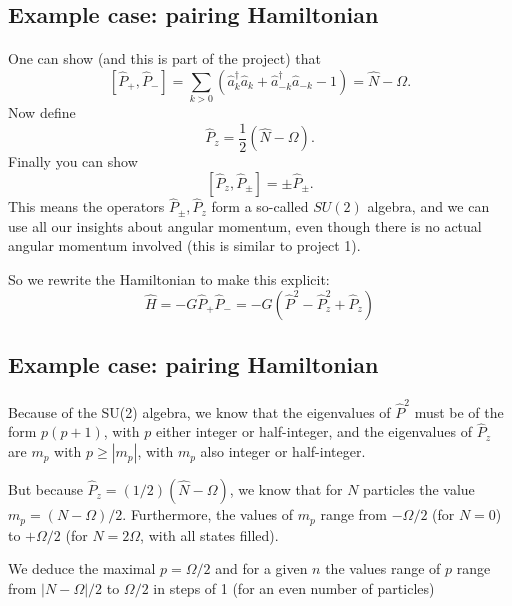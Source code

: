 \documentclass[%
twoside,                 %
final,                   %
10pt]{article}
\begin{document}
\subsection*{Example case: pairing Hamiltonian}

\paragraph{}

One can show (and this is part of the project) that
\[
\left [ \hat{P}_+, \hat{P}_- \right ] = \sum_{k> 0} \left( \hat{a}^\dagger_k \hat{a}_k 
+ \hat{a}^\dagger_{-{k}} \hat{a}_{-{k}} - 1 \right) = \hat{N} - \Omega.
\]
Now define 
\[
\hat{P}_z = \frac{1}{2} ( \hat{N} -\Omega).
\]
Finally you can show
\[
\left [ \hat{P}_z , \hat{P}_\pm \right ] = \pm \hat{P}_\pm.
\]
This means the operators $\hat{P}_\pm, \hat{P}_z$ form a so-called  $SU(2)$ algebra, and we can 
use all our insights about angular momentum, even though there is no actual 
angular momentum involved (this is similar to project 1).

So we rewrite the Hamiltonian to make this explicit:
\[
\hat{H} = -G \hat{P}_+ \hat{P}_- 
= -G \left( \hat{P}^2 - \hat{P}_z^2 + \hat{P}_z\right)
\]



\subsection*{Example case: pairing Hamiltonian}

\paragraph{}

Because of the SU(2) algebra, we know that the eigenvalues of 
$\hat{P}^2$ must be of the form $p(p+1)$, with $p$ either integer or half-integer, and the eigenvalues of $\hat{P}_z$ 
are $m_p$ with $p \geq | m_p|$, with $m_p$ also integer or half-integer. 


But because $\hat{P}_z = (1/2)(\hat{N}-\Omega)$, we know that for $N$ particles 
the value $m_p = (N-\Omega)/2$. Furthermore, the values of $m_p$ range from 
$-\Omega/2$ (for $N=0$) to $+\Omega/2$ (for $N=2\Omega$, with all states filled). 

We deduce the maximal $p = \Omega/2$ and for a given $n$ the 
values range of $p$ range from $|N-\Omega|/2$ to $\Omega/2$ in steps of 1 
(for an even number of particles) 
\end{document}
